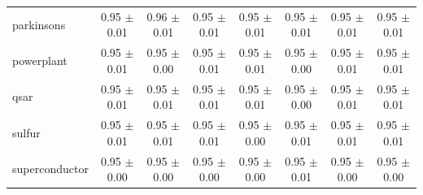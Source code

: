 \begin{table}[!htbp]
{\begin{tabular}{lccccccc}
parkinsons & 0.95 $\pm$ 0.01 & 0.96 $\pm$ 0.01 & 0.95 $\pm$ 0.01 & 0.95 $\pm$ 0.01 & 0.95 $\pm$ 0.01 & 0.95 $\pm$ 0.01 & 0.95 $\pm$ 0.01 \\
powerplant & 0.95 $\pm$ 0.01 & 0.95 $\pm$ 0.00 & 0.95 $\pm$ 0.01 & 0.95 $\pm$ 0.01 & 0.95 $\pm$ 0.00 & 0.95 $\pm$ 0.01 & 0.95 $\pm$ 0.01 \\
qsar & 0.95 $\pm$ 0.01 & 0.95 $\pm$ 0.01 & 0.95 $\pm$ 0.01 & 0.95 $\pm$ 0.01 & 0.95 $\pm$ 0.00 & 0.95 $\pm$ 0.01 & 0.95 $\pm$ 0.01 \\
sulfur & 0.95 $\pm$ 0.01 & 0.95 $\pm$ 0.01 & 0.95 $\pm$ 0.01 & 0.95 $\pm$ 0.00 & 0.95 $\pm$ 0.01 & 0.95 $\pm$ 0.01 & 0.95 $\pm$ 0.01 \\
superconductor & 0.95 $\pm$ 0.00 & 0.95 $\pm$ 0.00 & 0.95 $\pm$ 0.00 & 0.95 $\pm$ 0.00 & 0.95 $\pm$ 0.01 & 0.95 $\pm$ 0.00 & 0.95 $\pm$ 0.00 \\
\bottomrule
\end{tabular}
}
\end{table}